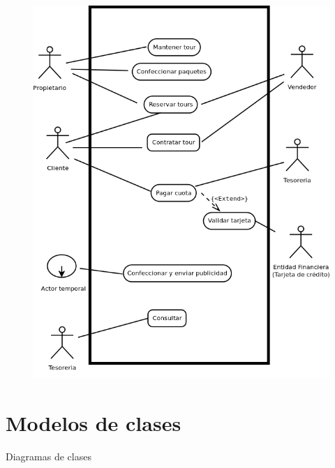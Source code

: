 \documentclass[12pt,a4paper,titlepage,oneside]{article}
\begin{document}
\begin{figure}[htb]
\centerline{\includegraphics[width=1.0\textwidth]{diagramaCasosDeUso}}
\label{fig:celda}
\end{figure}
 
 
 
\section{Modelos de clases}

Diagramas de clases  
 
 
\end{document}
